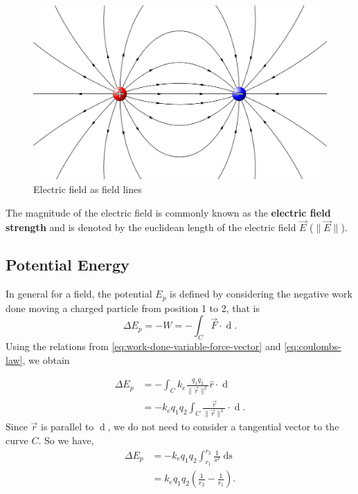 \begin{figure}[h!]
    \centering
    \includegraphics[scale=0.25]{notes/images/Electric-Field-Lines.JPG}
    \caption{Electric field as field lines}
\end{figure}
\FloatBarrier

The magnitude of the electric field is commonly known as the \textbf{electric field strength} and is denoted by the euclidean length of the electric field $\vec{E}$ ($\| \vec{E} \|$). 


\subsection{Potential Energy}

In general for a field, the potential $E_p$ is defined by considering the negative work done moving a charged particle from position 1 to 2, that is
\begin{equation}
    \Delta E_p = -W = - \int_C \vec{F} \cdot \mathop{\mathrm{d}\vec{s}}.
\end{equation}
Using the relations from \ref{eq:work-done-variable-force-vector} and \ref{eq:coulombs-law}, we obtain

\begin{align}
     \Delta E_p &= - \int_C k_e \frac{q_1 q_2}{\| \vec{r} \|^2} \hat{r} \cdot \mathop{\mathrm{d}\vec{s}} \\
    &= - k_e q_1 q_2 \int_C \frac{\vec{r}}{\| \vec{r} \|^3} \cdot \mathop{\mathrm{d}\vec{s}}.
\end{align}
Since $\vec{r}$ is parallel to $\mathop{\mathrm{d}\vec{s}}$, we do not need to consider a tangential vector to the curve $C$. So we have,
\begin{align}
    \Delta E_p &= - k_e q_1 q_2 \int_{r_1}^{r_2} \frac{1}{s^2} \mathop{\mathrm{d}s} \\
    &= k_e q_1 q_2 \left(\frac{1}{r_2} - \frac{1}{r_1}\right).
\end{align}

